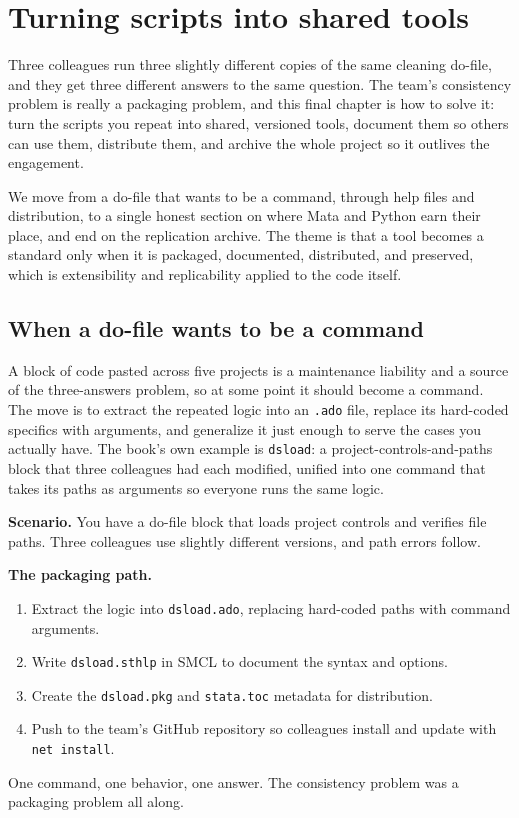 \documentclass[
    a4paper,
    fontsize=10pt,
    twoside=true,
    numbers=noenddot,
]{kaobook}
\newcounter{appliedexample}
\newenvironment{appliedexample}[1][]{%
    \refstepcounter{appliedexample}%
    \begin{appliedexamplebox}[frametitle={Applied Example~\theappliedexample.~~#1}]%
}{%
    \end{appliedexamplebox}%
}
\begin{document}
\chapter{Turning scripts into shared tools}\label{ch:tools}

Three colleagues run three slightly different copies of the same cleaning do-file, and they get three different answers to the same question. The team's consistency problem is really a packaging problem, and this final chapter is how to solve it: turn the scripts you repeat into shared, versioned tools, document them so others can use them, distribute them, and archive the whole project so it outlives the engagement.

We move from a do-file that wants to be a command, through help files and distribution, to a single honest section on where Mata and Python earn their place, and end on the replication archive. The theme is that a tool becomes a standard only when it is packaged, documented, distributed, and preserved, which is extensibility and replicability applied to the code itself.

\section{When a do-file wants to be a command}
A block of code pasted across five projects is a maintenance liability and a source of the three-answers problem, so at some point it should become a command. The move is to extract the repeated logic into an \texttt{.ado} file, replace its hard-coded specifics with arguments, and generalize it just enough to serve the cases you actually have. The book's own example is \texttt{dsload}: a project-controls-and-paths block that three colleagues had each modified, unified into one command that takes its paths as arguments so everyone runs the same logic.

\begin{appliedexample}[Turning a one-off script into a shared tool]
\textbf{Scenario.} You have a do-file block that loads project controls and verifies file paths. Three colleagues use slightly different versions, and path errors follow.

\medskip
\textbf{The packaging path.}
\begin{enumerate}
    \item Extract the logic into \texttt{dsload.ado}, replacing hard-coded paths with command arguments.
    \item Write \texttt{dsload.sthlp} in SMCL to document the syntax and options.
    \item Create the \texttt{dsload.pkg} and \texttt{stata.toc} metadata for distribution.
    \item Push to the team's GitHub repository so colleagues install and update with \texttt{net install}.
\end{enumerate}
One command, one behavior, one answer. The consistency problem was a packaging problem all along.
\end{appliedexample}
\end{document}
